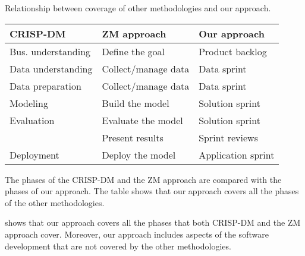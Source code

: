 \begin{tablebox}[label=tab:phases]{Relationship between coverage of other methodologies and our approach.}
  \centering
  \small %
  \begin{tabular}{lll}
    \toprule
    \textbf{CRISP-DM} & \textbf{ZM approach} & \textbf{Our approach} \\
    \midrule
    Bus. understanding & Define the goal & Product backlog \\
    Data understanding & Collect/manage data & Data sprint \\
    Data preparation & Collect/manage data & Data sprint \\
    Modeling & Build the model & Solution sprint \\
    Evaluation & Evaluate the model & Solution sprint \\
    & Present results & Sprint reviews \\
    Deployment & Deploy the model & Application sprint \\
    \bottomrule
  \end{tabular}
  \tcblower
  The phases of the CRISP-DM and the ZM approach are compared with the phases of our
  approach.  The table shows that our approach covers all the phases of the other
  methodologies.
\end{tablebox}

 shows that our approach covers all the phases that both CRISP-DM and the
ZM approach cover.  Moreover, our approach includes aspects of the software development that
are not covered by the other methodologies.

